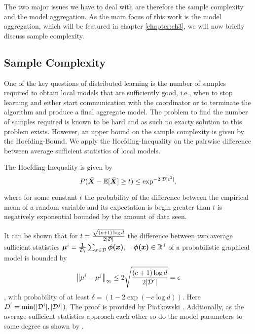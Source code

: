 The two major issues we have to deal with are therefore the sample complexity and the model aggregation.
As the main focus of this work is the model aggregation, which will be featured in chapter \ref{chapter:ch3}, we will now briefly discuss sample complexity.

\subsection{Sample Complexity}
One of the key questions of distributed learning is the number of samples required to obtain local models that are sufficiently good, i.e., when to stop learning and either start communication with the coordinator
or to terminate the algorithm and produce a final aggregate model. 
The problem to find the number of samples required is known to be hard  and as such no exacty solution to this problem exists.
However, an upper bound on the sample complexity is given by the Hoefding-Bound. 
We apply the Hoefding-Inequality on the pairwise difference between average sufficient statistics of local models.

The Hoefding-Inequality is given by
\begin{equation}
    P(\boldsymbol{\bar{X}} - \mathbb{E}[\boldsymbol{\bar{X}}] \geq t ) \leq \exp^{-2\lvert\mathcal{D}]t^2\rvert},
\end{equation}

where for some constant $t$ the probability of the difference between the empirical mean of a random variable and its expectation is begin greater than $t$ is negatively exponential bounded by the amount of data seen.

It can be shown that for $t = \frac{\sqrt{(c+1) \log d}}{2\lvert\mathcal{D}\rvert}$ the difference between two average sufficient statistics $\boldsymbol{\mu}^i = \frac{1}{\mathcal{D}_i} \sum_{x \in \mathcal{D}} \boldsymbol{\phi(x)}, \quad \boldsymbol{\phi(x)} \in \mathbb{R}^d$ of a probabilistic graphical model is bounded by
\begin{equation}
    \left\lVert\mu^{i} -  \mu^{j}\right\rVert_\infty \leq 2 \sqrt{
        \frac{(c+1) \log d}
        {2\lvert\mathcal{D^{'}}\rvert}
        } = \epsilon
\end{equation},
with probability of at least $\delta= (1- 2 \exp(-c \log d))$. Here $D^{'} = \min(\lvert\mathcal{D}^i\rvert, \lvert\mathcal{D}^j\rvert)$.
The proof is provided by Piatkowski \cite{piatkowski2019distributed}. 
Addtionally, as the average sufficient statistics approach each other so do the model parameters to some degree as shown by .

